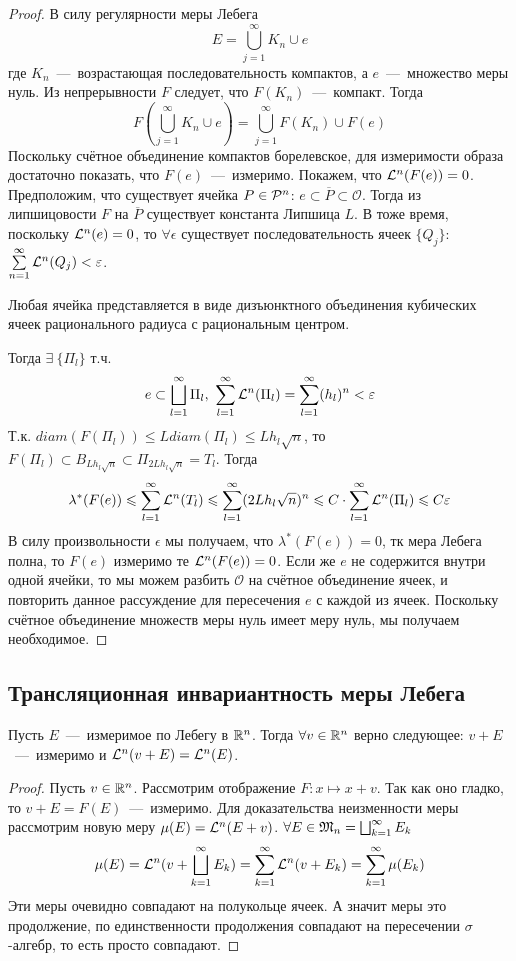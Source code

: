 \begin{proof}
    В силу регулярности меры Лебега \[E = \bigcup\limits_{j = 1}^\infty K_n \cup e\]
    где $K_n$~---~возрастающая последовательность компактов, а $e$~---~множество меры нуль. Из непрерывности $F$ следует, что $F(K_n)$~---~компакт. Тогда \[F(\bigcup\limits_{j = 1}^\infty K_n \cup e) = \bigcup\limits_{j = 1}^\infty F(K_n) \cup F(e)\]
    Поскольку счётное объединение компактов борелевское, для измеримости образа достаточно показать, что $F(e)$~---~измеримо. Покажем, что $\mathcal{L}^n(F(e)) = 0$. Предположим, что существует ячейка $P \in \mathcal{P}^n$: $e \subset \overline{P} \subset \mathcal{O}$. Тогда из липшицовости $F$ на $\overline{P}$ существует константа Липшица $L$. В тоже время, поскольку $\mathcal{L}^n(e) = 0$, то $\forall \epsilon$ существует последовательность ячеек $\{Q_j\}$: $\sum\limits_{n = 1}^\infty \mathcal{L}^n(Q_j) < \varepsilon$.
\begin{fact}
    Любая ячейка представляется в виде дизъюнктного объединения кубических ячеек рационального радиуса с рациональным центром.
\end{fact}
    Тогда $\exists \  \{\Pi_l\}$ т.ч. \[e \subset \bigsqcup\limits_{l = 1}^\infty \Pi_l, \ \sum\limits_{l = 1}^\infty \mathcal{L}^n(\Pi_l) = \sum\limits_{l = 1}^\infty (h_l)^n < \varepsilon\]
    Т.к. $diam(F(\Pi_l)) \leq Ldiam(\Pi_l) \leq Lh_l\sqrt{n}$,
    то $F(\Pi_l) \subset B_{Lh_l\sqrt{n}} \subset \Pi_{2Lh_l\sqrt{n}} = T_l$. Тогда \[\lambda^*(F(e)) \leqslant \sum\limits_{l = 1}^\infty \mathcal{L}^n(T_l) \leqslant \sum\limits_{l = 1}^\infty (2Lh_l\sqrt{n})^n \leqslant C\cdot\sum\limits_{l = 1}^\infty \mathcal{L}^n(\Pi_l) \leqslant C\varepsilon\]
    В силу произвольности $\epsilon$ мы получаем, что $\lambda^*(F(e)) = 0$, тк мера Лебега полна, то $F(e)$ измеримо те $\mathcal{L}^n(F(e)) = 0$. Если же $e$ не содержится внутри одной ячейки, то мы можем разбить $\mathcal{O}$ на счётное объединение ячеек, и повторить данное рассуждение для пересечения $e$ с каждой из ячеек. Поскольку счётное объединение множеств меры нуль имеет меру нуль, мы получаем необходимое. 
\end{proof}
\subsection{Трансляционная инвариантность меры Лебега}
\begin{theorem}
    Пусть $E$~---~измеримое по Лебегу в $\mathbb{R}^n$. Тогда $\forall v \in \mathbb{R}^n$ верно следующее: $v + E$~---~измеримо и $\mathcal{L}^n(v + E) = \mathcal{L}^n(E)$.
\end{theorem}
\begin{proof}
    Пусть $v \in \mathbb{R}^n$. Рассмотрим отображение $F: x \mapsto x + v$. Так как оно гладко, то $v + E = F(E)$~---~измеримо. Для доказательства неизменности меры рассмотрим новую меру $\mu(E) = \mathcal{L}^n(E + v)$.  $\forall E \in \mathfrak{M}_n = \bigsqcup_{k=1}^{\infty}E_k$
    \[
    \mu(E) = \mathcal{L}^n( v + \bigsqcup_{k=1}^{\infty} E_k) = \sum_{k=1}^{\infty}\mathcal{L}^n(v + E_k) = \sum_{k=1}^{\infty}\mu(E_k)
    \]
    Эти меры очевидно совпадают на полукольце ячеек. А значит меры это продолжение, по единственности продолжения совпадают на пересечении $\sigma$-алгебр, то есть просто совпадают.
\end{proof}

